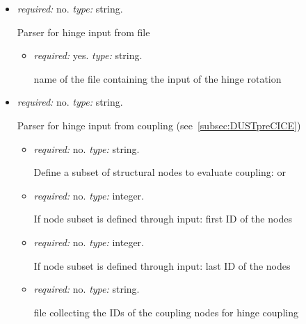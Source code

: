 \begin{itemize}
\begin{itemize}
    \end{itemize}
    \item {} \textit{required:} no. \textit{type:} string. 
    
    Parser for hinge input from file
    
    \begin{itemize}
        \item {} \textit{required:} yes. \textit{type:} string. 
        
        name of the file containing the input of the hinge rotation
    \end{itemize}
    
    \item {} \textit{required:} no. \textit{type:} string.
    
    Parser for hinge input from coupling (see~\ref{subsec:DUSTpreCICE})
    
    \begin{itemize}
        \item {} \textit{required:} no. \textit{type:} string.
        
        Define a subset of structural nodes to evaluate coupling:  or 
        
        \item {} \textit{required:} no. \textit{type:} integer. 
        
        If node subset is defined through  input: first ID of the nodes
        
        \item {} \textit{required:} no. \textit{type:} integer. 
        
        If node subset is defined through  input: last ID of the nodes
        
        \item {} \textit{required:} no. \textit{type:} string.
        
        file collecting the IDs of the coupling nodes for hinge coupling
    \end{itemize}
    
    

    
\end{itemize}




